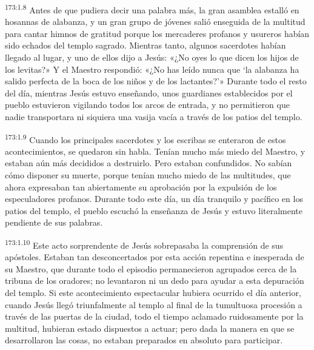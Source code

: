 \par 
\textsuperscript{173:1.8} Antes de que pudiera decir una palabra más, la gran asamblea estalló en hosannas de alabanza, y un gran grupo de jóvenes salió enseguida de la multitud para cantar himnos de gratitud porque los mercaderes profanos y usureros habían sido echados del templo sagrado. Mientras tanto, algunos sacerdotes habían llegado al lugar, y uno de ellos dijo a Jesús: «¿No oyes lo que dicen los hijos de los levitas?» Y el Maestro respondió: «¿No has leído nunca que `la alabanza ha salido perfecta de la boca de los niños y de los lactantes?'» Durante todo el resto del día, mientras Jesús estuvo enseñando, unos guardianes establecidos por el pueblo estuvieron vigilando todos los arcos de entrada, y no permitieron que nadie transportara ni siquiera una vasija vacía a través de los patios del templo.

\par 
\textsuperscript{173:1.9} Cuando los principales sacerdotes y los escribas se enteraron de estos acontecimientos, se quedaron sin habla. Tenían mucho más miedo del Maestro, y estaban aún más decididos a destruirlo. Pero estaban confundidos. No sabían cómo disponer su muerte, porque tenían mucho miedo de las multitudes, que ahora expresaban tan abiertamente su aprobación por la expulsión de los especuladores profanos. Durante todo este día, un día tranquilo y pacífico en los patios del templo, el pueblo escuchó la enseñanza de Jesús y estuvo literalmente pendiente de sus palabras.

\par 
\textsuperscript{173:1.10} Este acto sorprendente de Jesús sobrepasaba la comprensión de sus apóstoles. Estaban tan desconcertados por esta acción repentina e inesperada de su Maestro, que durante todo el episodio permanecieron agrupados cerca de la tribuna de los oradores; no levantaron ni un dedo para ayudar a esta depuración del templo. Si este acontecimiento espectacular hubiera ocurrido el día anterior, cuando Jesús llegó triunfalmente al templo al final de la tumultuosa procesión a través de las puertas de la ciudad, todo el tiempo aclamado ruidosamente por la multitud, hubieran estado dispuestos a actuar; pero dada la manera en que se desarrollaron las cosas, no estaban preparados en absoluto para participar.

